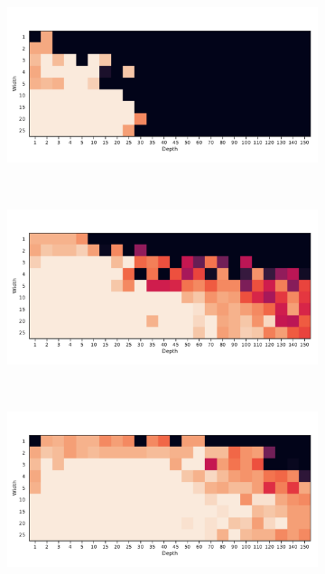 \begin{figure}
  \centering
    \begin{subfigure}[b]{0.3\textwidth}
        \includegraphics[width=\textwidth]{img/moons_grid/acc-relu.pdf}
        \caption{\ReLU}
        \label{fig:moons_grid_relu}
    \end{subfigure}
    ~ %
    \centering
    \begin{subfigure}[b]{0.3\textwidth}
        \includegraphics[width=\textwidth]{img/moons_grid/acc-relu-bn.pdf}
        \caption{\ReLUBN}
        \label{fig:moons_grid_relubn}
    \end{subfigure}
    ~ %
    \centering
    \begin{subfigure}[b]{0.3\textwidth}
        \includegraphics[width=\textwidth]{img/moons_grid/acc-sep-up-0-0001.pdf}

\end{subfigure}
\end{figure}
